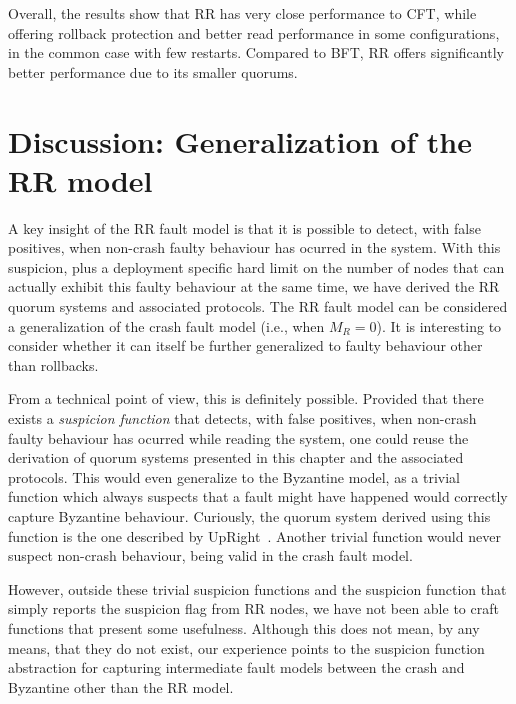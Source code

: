 Overall, the results show that \ac{RR} has very close performance
to \ac{CFT}, while offering rollback protection and better read performance
in some configurations, in the common case with few restarts.
Compared to \ac{BFT}, \ac{RR} offers significantly better performance
due to its smaller quorums.

\section{Discussion: Generalization of the \ac{RR} model}\label{sec:discussion}

A key insight of the \ac{RR} fault model is that it is possible
to detect, with false positives, when non-crash faulty behaviour
has ocurred in the system. With this suspicion, plus a deployment
specific hard limit on the number of nodes that can actually
exhibit this faulty behaviour at the same time, we have derived
the \ac{RR} quorum systems and associated protocols. The \ac{RR}
fault model can be considered a generalization of the crash fault
model (i.e., when $M_R = 0$). It is interesting to consider
whether it can itself be further generalized to faulty behaviour
other than rollbacks.

From a technical point of view, this is definitely possible.
Provided that there exists a \emph{suspicion function} that
detects, with false positives, when non-crash faulty behaviour
has ocurred while reading the system, one could reuse the derivation
of quorum systems presented in this chapter and the associated
protocols. This would even generalize to the Byzantine model, as a
trivial function which always suspects that a fault
might have happened would correctly capture Byzantine behaviour.
Curiously, the quorum system derived using this function is the
one described by UpRight~\cite{upright}. Another trivial function
would never suspect non-crash behaviour, being valid in the crash
fault model.

However, outside these trivial suspicion functions and the
suspicion function that simply reports the suspicion flag from
\ac{RR} nodes, we have not been able to craft functions that
present some usefulness. Although this does not mean, by any
means, that they do not exist, our experience points to the
suspicion function  abstraction for capturing
intermediate fault models between the crash and Byzantine other
than the \ac{RR} model.
